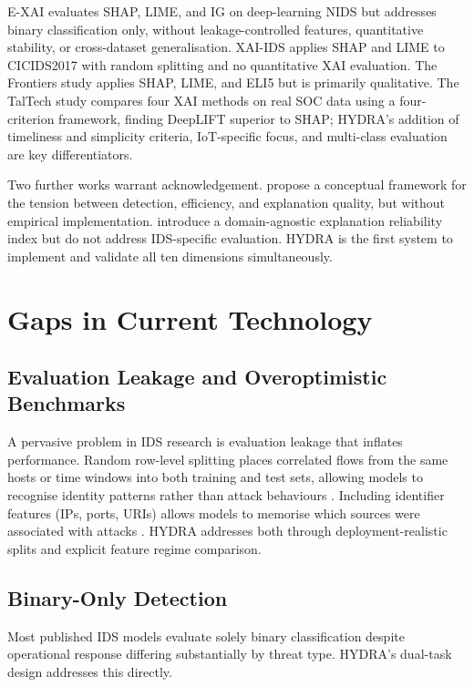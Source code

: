 \documentclass[12pt,a4paper]{report}
\begin{document}
E-XAI \cite{arreche2024} evaluates SHAP, LIME, and IG on deep-learning NIDS but addresses binary classification only, without leakage-controlled features, quantitative stability, or cross-dataset generalisation. XAI-IDS \cite{arreche2024b} applies SHAP and LIME to CICIDS2017 with random splitting and no quantitative XAI evaluation. The Frontiers study \cite{mohale2025} applies SHAP, LIME, and ELI5 but is primarily qualitative. The TalTech study \cite{kalakoti2025} compares four XAI methods on real SOC data using a four-criterion framework, finding DeepLIFT superior to SHAP; HYDRA's addition of timeliness and simplicity criteria, IoT-specific focus, and multi-class evaluation are key differentiators.

Two further works warrant acknowledgement. \cite{adadi2018} propose a conceptual framework for the tension between detection, efficiency, and explanation quality, but without empirical implementation. \cite{sengupta2026} introduce a domain-agnostic explanation reliability index but do not address IDS-specific evaluation. HYDRA is the first system to implement and validate all ten dimensions simultaneously.

\section{Gaps in Current Technology}
\label{sec:gaps}

\subsection{Evaluation Leakage and Overoptimistic Benchmarks}
\label{sec:leakage-gap}

A pervasive problem in IDS research is evaluation leakage that inflates performance. Random row-level splitting places correlated flows from the same hosts or time windows into both training and test sets, allowing models to recognise identity patterns rather than attack behaviours \cite{lanvin2022}. Including identifier features (IPs, ports, URIs) allows models to memorise which sources were associated with attacks \cite{tareq2022}. HYDRA addresses both through deployment-realistic splits and explicit feature regime comparison.

\subsection{Binary-Only Detection}
\label{sec:binary-only}

Most published IDS models evaluate solely binary classification despite operational response differing substantially by threat type. HYDRA's dual-task design addresses this directly.
\end{document}
